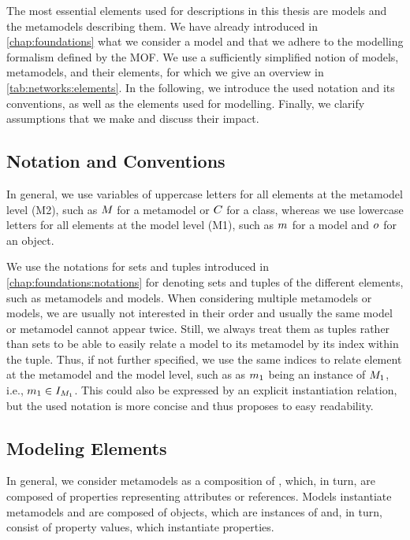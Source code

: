 The most essential elements used for descriptions in this thesis are models and the metamodels describing them.
We have already introduced in \autoref{chap:foundations} what we consider a model and that we adhere to the modelling formalism defined by the \gls{MOF}.
We use a sufficiently simplified notion of models, metamodels, and their elements, for which we give an overview in \autoref{tab:networks:elements}.
In the following, we introduce the used notation and its conventions, as well as the elements used for modelling.
Finally, we clarify assumptions that we make and discuss their impact.


\subsection{Notation and Conventions}


In general, we use variables of uppercase letters for all elements at the metamodel level (M2), such as $M_{}$ for a metamodel or $C_{}$ for a class, whereas we use lowercase letters for all elements at the model level (M1), such as $m_{}$ for a model and $o_{}$ for an object.

We use the notations for sets and tuples introduced in \autoref{chap:foundations:notations} for denoting sets and tuples of the different elements, such as metamodels and models.
When considering multiple metamodels or models, we are usually not interested in their order and usually the same model or metamodel cannot appear twice.
Still, we always treat them as tuples rather than sets to be able to easily relate a model to its metamodel by its index within the tuple.
Thus, if not further specified, we use the same indices to relate element at the metamodel and the model level, such as as $m_{1}$ being an instance of $M_{1}$, i.e., $m_{1} \in I_{M_{1}}$.
This could also be expressed by an explicit instantiation relation, but the used notation is more concise and thus proposes to easy readability.


\subsection{Modeling Elements}

In general, we consider metamodels as a composition of \metaclasses, which, in turn, are composed of properties representing attributes or references.
Models instantiate metamodels and are composed of objects, which are instances of \metaclasses and, in turn, consist of property values, which instantiate properties.


